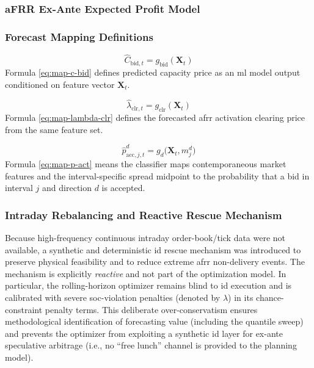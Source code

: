 \subsubsection{aFRR Ex-Ante Expected Profit Model}

\subsubsection{Forecast Mapping Definitions}
\begin{equation}\label{eq:map-c-bid}
    \hat{C}_{\text{bid}, t} = g_{\text{bid}}(\mathbf{X}_{t})
\end{equation}
Formula \ref{eq:map-c-bid} defines predicted capacity price as an \gls{ml} model output conditioned on feature vector $\mathbf{X}_{t}$.

\begin{equation}\label{eq:map-lambda-clr}
    \hat{\lambda}_{\text{clr}, t} = g_{\text{clr}}(\mathbf{X}_{t})
\end{equation}
Formula \ref{eq:map-lambda-clr} defines the forecasted \gls{afrr} activation clearing price from the same feature set.

\begin{equation}\label{eq:map-p-act}
    \hat{p}_{\text{acc}, j, t}^{d} = g_{d}\big(\mathbf{X}_{t}, m_{j}^{d}\big)
\end{equation}
Formula \ref{eq:map-p-act} means the classifier maps contemporaneous market features and the interval-specific spread midpoint to the probability that a bid in interval $j$ and direction $d$ is accepted.



\subsubsection{Intraday Rebalancing and Reactive Rescue Mechanism}

Because high-frequency continuous intraday order-book/tick data were not available, a synthetic and deterministic \gls{id} rescue mechanism was introduced to preserve physical feasibility and to reduce extreme \gls{afrr} non-delivery events. The mechanism is explicitly \emph{reactive} and not part of the optimization model. In particular, the rolling-horizon optimizer remains blind to \gls{id} execution and is calibrated with severe \gls{soc}-violation penalties (denoted by $\lambda$) in its chance-constraint penalty terms. This deliberate over-conservatism ensures methodological identification of forecasting value (including the quantile sweep) and prevents the optimizer from exploiting a synthetic \gls{id} layer for ex-ante speculative arbitrage (i.e., no ``free lunch'' channel is provided to the planning model).

